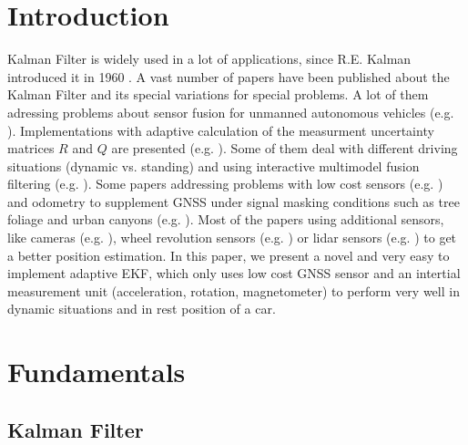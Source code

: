 \documentclass[conference]{IEEEtran}
\begin{document}
\section{Introduction}
% 
% 
% 
% 
 Kalman Filter is widely used in a lot of applications, since R.E. Kalman introduced it in 1960 \cite{Kalman1960}. A vast number of papers have been published about the Kalman Filter and its special variations for special problems. A lot of them adressing problems about sensor fusion for unmanned autonomous vehicles (e.g. \cite{Penarrocha2010,Mourikis2007,Sun2010,Barczyk2011}). Implementations with adaptive calculation of the measurment uncertainty matrices $R$ and $Q$ are presented (e.g. \cite{Bistrovs2012}). Some of them deal with different driving situations (dynamic vs. standing) and using interactive multimodel fusion filtering (e.g. \cite{Toledo-Moreo2007,Stephen2001}). Some papers addressing problems with low cost sensors (e.g. \cite{Rosenberg2006,Toledo-Moreo2007,Kingston2004}) and odometry
to supplement GNSS under signal masking conditions such as tree foliage and urban canyons (e.g. \cite{Stephen2001}). Most of the papers using additional sensors, like cameras (e.g. \cite{Effertz2009,Holt2004}), wheel revolution sensors (e.g. \cite{Stephen2001}) or lidar sensors (e.g. \cite{Holt2004}) to get a better position estimation.
In this paper, we present a novel and very easy to implement adaptive EKF, which only uses low cost GNSS sensor and an intertial measurement unit (acceleration, rotation, magnetometer) to perform very well in dynamic situations and in rest position of a car.



\section{Fundamentals}

\subsection{Kalman Filter}
\end{document}
